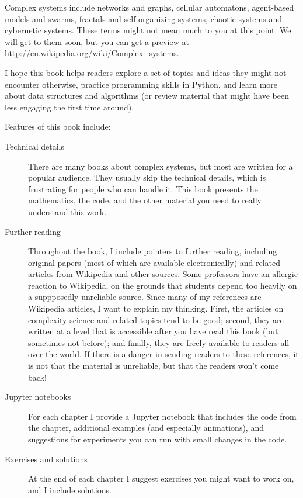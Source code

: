 \documentclass[12pt]{book}
\theoremstyle{exercise}
\begin{document}
Complex systems include networks and graphs, cellular automatons,
agent-based models and swarms, fractals and self-organizing
systems, chaotic systems and cybernetic systems.  These terms
might not mean much to you at this point.  We will get to them
soon, but you can get a preview at
\url{http://en.wikipedia.org/wiki/Complex_systems}.

I hope this book helps readers explore a set of topics
and ideas they might not encounter otherwise, practice programming
skills in Python, and learn more about data structures and
algorithms (or review material that might have been less engaging
the first time around).

Features of this book include:

\begin{description}

\item[Technical details] There are many books about complex systems,
  but most are written for a popular audience.  They usually skip the
  technical details, which is frustrating for people who can handle
  it.  This book presents the mathematics, the code, and the other
  material you need to really understand this work.

\item[Further reading] Throughout the book, I include pointers to
  further reading, including original papers (most of which are
  available electronically) and related articles from Wikipedia and
  other sources.  Some professors have an allergic reaction to
  Wikipedia, on the grounds that students depend too heavily on a
  suppposedly unreliable source.  Since many of my references are
  Wikipedia articles, I want to explain my thinking.  First, the
  articles on complexity science and related topics tend to be good;
  second, they are written at a level that is accessible after you
  have read this book (but sometimes not before); and finally, they
  are freely available to readers all over the world.  If there is a
  danger in sending readers to these references, it is not that the
  material is unreliable, but that the readers won't come back!

\item[Jupyter notebooks] For each chapter I provide a Jupyter notebook
  that includes the code from the chapter, additional examples (and
  especially animations), and suggestions for experiments you can run
  with small changes in the code.

\item[Exercises and solutions] At the end of each chapter I suggest
  exercises you might want to work on, and I include solutions.

\end{description}
\end{document}

